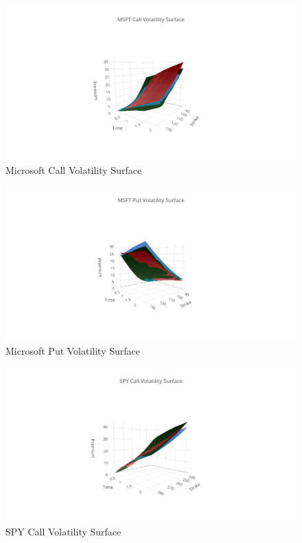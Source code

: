 \documentclass{article}
\begin{document}
\begin{figure}[h!]
\includegraphics[width =\textwidth]{images/VolSurface/MSFTCall.png}
\caption{Microsoft Call Volatility Surface}
\centering
\end{figure}
\begin{figure}[h!]
\includegraphics[width =\textwidth]{images/VolSurface/MSFTPut.png}
\caption{Microsoft Put Volatility Surface}
\centering
\end{figure}
\begin{figure}[h!]
\includegraphics[width =\textwidth]{images/VolSurface/SPYCall.png}
\caption{SPY Call Volatility Surface}
\centering
\end{figure}
\end{document}
